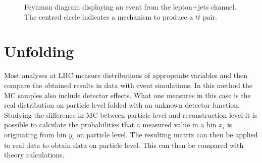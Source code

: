 	\begin{figure}
		\centering
		\caption{Feynman diagram \cite{feynman} displaying an event from the lepton+jets channel. The centred circle indicates a mechanism to produce a $t\bar{t}$ pair.}
		\label{fig:semilep}
	\end{figure}
	

\section{Unfolding}
	Most analyses at LHC measure distributions of appropriate variables and then compare the obtained results in data with event simulations. In this method the MC samples also include detector effects. What one measures in this case is the real distribution on particle level folded with an unknown detector function. Studying the difference in MC between particle level and reconstruction level it is possible to calculate the probabilities that a measured value in a bin $x_i$ is originating from bin $y_i$ on particle level. The resulting matrix can then be applied to real data to obtain data on particle level. This can then be compared with theory calculations.
	